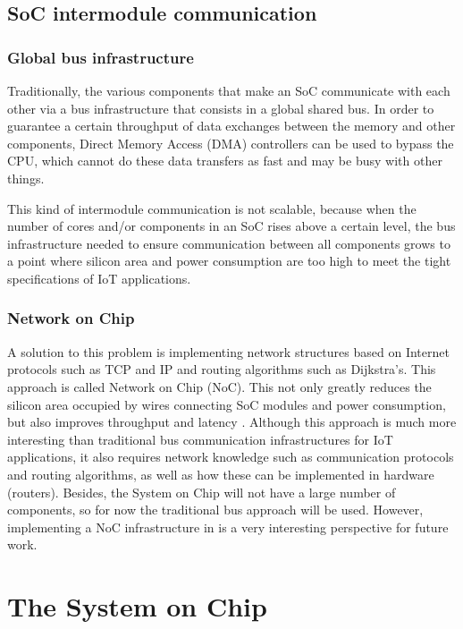 \subsection{SoC intermodule communication}

\subsubsection{Global bus infrastructure}
Traditionally, the various components that make an SoC communicate with each
other via a bus infrastructure that consists in a global shared bus. In order to
guarantee a certain throughput of data exchanges between the memory and other
components, Direct Memory Access (DMA) controllers can be used to bypass the
CPU, which cannot do these data transfers as fast and may be busy with other
things.

This kind of intermodule communication is not scalable, because when the number
of cores and/or components in an SoC rises above a certain level, the bus
infrastructure needed to ensure communication between all components grows to a
point where silicon area and power consumption are too high to meet the tight
specifications of IoT applications.

\subsubsection{Network on Chip}
A solution to this problem is implementing network structures based on Internet
protocols such as TCP and IP and routing algorithms such as Dijkstra's. This
approach is called Network on Chip (NoC). This not only greatly reduces the
silicon area occupied by wires connecting SoC modules and power consumption, but
also improves throughput and latency \cite{bib:noc}. Although this approach is
much more interesting than traditional bus communication infrastructures for IoT
applications, it also requires network knowledge such as communication protocols
and routing algorithms, as well as how these can be implemented in hardware
(routers). Besides, the \socname System on Chip will not have a large number of
components, so for now the traditional bus approach will be used. However,
implementing a NoC infrastructure in \socname is a very interesting perspective
for future work.

\section{The \socname System on Chip}
\label{section:mysoc}

